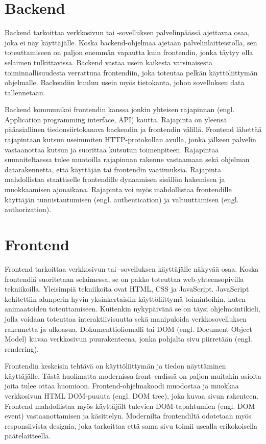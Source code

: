 \section{Backend}
Backend tarkoittaa verkkosivun tai -sovelluksen palvelinpäässä ajettavaa osaa, joka ei näy käyttäjälle. Koska
backend-ohjelmaa ajetaan palvelinlaitteistolla, sen toteuttamiseen on paljon enemmän vapautta kuin frontendin, jonka
täytyy olla selaimen tulkittavissa. Backend vastaa usein kaikesta varsinaisesta toiminnallisuudesta verrattuna
frontendiin, joka toteutaa pelkän käyttöliittymän ohjelmalle. Backendiin kuuluu usein myös tietokanta, johon sovelluksen
data tallennetaan. \cite{fullstackdeveloper}

Backend kommunikoi frontendin kanssa jonkin yhteisen rajapinnan (engl. Application programming interface, API) kautta.
Rajapinta on yleensä pääasiallinen tiedonsiirtokanava backendin ja frontendin välillä. Frontend lähettää rajapintaan
kutsun useimmiten HTTP-protokollan avulla, jonka jälkeen palvelin vastaanottaa kutsun ja suorittaa kutsutun
toimenpiteen. Rajapintaa suunniteltaessa tulee muotoilla rajapinnan rakenne vastaamaan sekä ohjelman datarakennetta,
että käyttäjän tai frontendin vaatimuksia. Rajapinta mahdollistaa staattiselle frontendille dynaamisen sisällön
hakemisen ja muokkaamisen ajonaikana. Rajapinta voi myös mahdollistaa frontendille käyttäjän tunnistautumisen (engl.
authentication) ja valtuuttamisen (engl. authorization). \cite{fullstackdeveloper}

\section{Frontend}
Frontend tarkoittaa verkkosivun tai -sovelluksen käyttäjälle näkyvää osaa. Koska frontendiä suoritetaan selaimessa,
se on pakko toteuttaa web-yhteensopivilla tekniikoilla. Yleisimpiä tekniikoita ovat HTML, CSS ja JavaScript. JavaScript
kehitettiin alunperin hyvin yksinkertaisiin käyttöliittymä toimintoihin, kuten animaatoiden toteuttamiseen. Kuitenkin
nykypäivänä se on täysi ohjelmointikieli, jolla voidaan toteuttaa interaktiivisuutta sekä manipuloida verkkosovelluksen
rakennetta ja ulkoasua. Dokumenttioliomalli tai DOM (engl. Document Object Model) kuvaa verkkosivun puurakenteena, jonka
pohjalta sivu piirretään (engl. rendering). \cite{fullstackdeveloper}

Frontendin keskeisin tehtävä on käyttöliittymän ja tiedon näyttäminen käyttäjälle. Tästä huolimatta modernissa
front–endissä on paljon muitakin asioita joita tulee ottaa huomioon. Frontend-ohjelmakoodi muodostaa ja muokkaa
verkkosivun HTML DOM-puuuta (engl. DOM tree), joka kuvaa sivun rakenteen. Frontend mahdollistaa myös käyttäjält
tulevien DOM-tapahtumien (engl. DOM event) vastaanottamisen ja käsittelyn. Modernilta frontendiltä odotetaan myös
responsiivista designia, joka tarkoittaa että sama sivu toimii usealla erikokoisella päätelaitteella.
\cite{bignerdfrontend}

